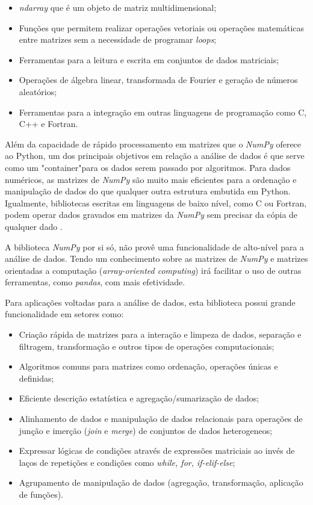 \begin{itemize}
    \item \textit{ndarray} que é um objeto de matriz multidimensional;
    \item Funções que permitem realizar operações vetoriais ou operações matemáticas entre matrizes sem a necessidade de programar \textit{loops};
    \item Ferramentas para a leitura e escrita em conjuntos de dados matriciais;
    \item Operações de álgebra linear, transformada de Fourier e geração de números aleatórios;
    \item Ferramentas para a integração em outras linguagens de programação como C, C++ e Fortran.
\end{itemize}

Além da capacidade de rápido processamento em matrizes que o \textit{NumPy} oferece ao Python, um dos principais objetivos em relação a análise de dados é que serve como um "container"\space para os dados serem passado por algoritmos. Para dados numéricos, as matrizes de \textit{NumPy} são muito mais eficientes para a ordenação e manipulação de dados do que qualquer outra estrutura embutida em Python. Igualmente, bibliotecas escritas em linguagens de baixo nível, como C ou Fortran, podem operar dados gravados em matrizes da \textit{NumPy} sem precisar da cópia de qualquer dado \cite{python-analysis}.

A biblioteca \textit{NumPy} por si só, não provê uma funcionalidade de alto-nível para a análise de dados. Tendo um conhecimento sobre as matrizes de \textit{NumPy} e matrizes orientadas a computação (\textit{array-oriented computing}) irá facilitar o uso de outras ferramentas, como \textit{pandas}, com mais efetividade.

Para aplicações voltadas para a análise de dados, esta biblioteca possui grande funcionalidade em setores como:

\begin{itemize}
    \item Criação rápida de matrizes para a interação e limpeza de dados, separação e filtragem, transformação e outros tipos de operações computacionais;
    \item Algoritmos comuns para matrizes como ordenação, operações únicas e definidas;
    \item Eficiente descrição estatística e agregação/sumarização de dados;
    \item Alinhamento de dados e manipulação de dados relacionais para operações de junção e imerção (\textit{join} e \textit{merge}) de conjuntos de dados heterogeneos;
    \item Expressar lógicas de condições através de expressões matriciais ao invés de laços de repetições e condições como \textit{while, for, if-elif-else};
    \item Agrupamento de manipulação de dados (agregação, transformação, aplicação de funções).
\end{itemize}

